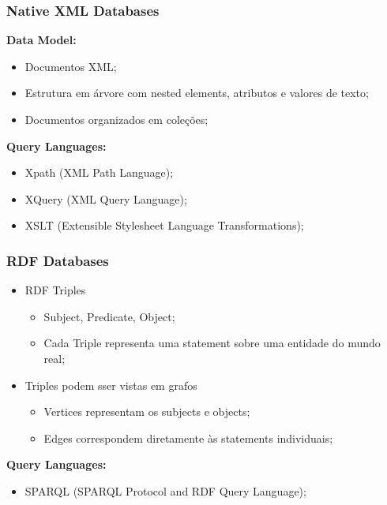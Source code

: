 \documentclass{article}
\begin{document}
\pagebreak

\subsubsection{Native XML Databases}

\begin{flushleft}
  \textbf{Data Model:}
  \begin{itemize}
    \item Documentos XML;
    \item Estrutura em árvore com nested elements, atributos e valores de texto;
    \item Documentos organizados em coleções;
  \end{itemize}

  \textbf{Query Languages:}
  \begin{itemize}
    \item Xpath (XML Path Language);
    \item XQuery (XML Query Language);
    \item XSLT (Extensible Stylesheet Language Transformations);
  \end{itemize}
\end{flushleft}

\subsubsection{RDF Databases}

\begin{flushleft}
  \begin{itemize}
    \item RDF Triples
    \begin{itemize}
      \item Subject, Predicate, Object;
      \item Cada Triple representa uma statement sobre uma entidade do mundo real;
    \end{itemize}
    \item Triples podem sser vistas em grafos
    \begin{itemize}
      \item Vertices representam os subjects e objects;
      \item Edges correspondem diretamente às statements individuais;
    \end{itemize}
  \end{itemize}

  \textbf{Query Languages:}
  \begin{itemize}
    \item SPARQL (SPARQL Protocol and RDF Query Language);
  \end{itemize}
\end{flushleft}
\end{document}
